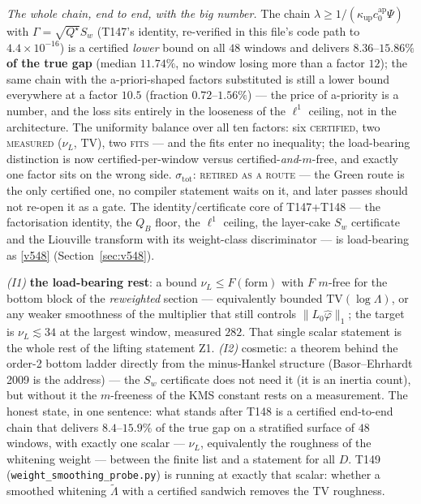 \documentclass[11pt,a4paper]{article}
\begin{document}
\emph{The whole chain, end to end, with the big number.} The chain
$\lambda\ge1/(\kappa_{\mathrm{up}}c_0^{\mathrm{ap}}\Psi)$ with $\Gamma=\sqrt{Q^\star}S_w$
(T147's identity, re-verified in this file's code path to $4.4\times10^{-16}$) is a certified
\emph{lower} bound on all $48$ windows and delivers $\mathbf{8.36}$--$\mathbf{15.86\%}$
\textbf{of the true gap} (median $11.74\%$, no window losing more than a factor $12$); the same
chain with the a-priori-shaped factors substituted is still a lower bound everywhere at a
factor $10.5$ (fraction $0.72$--$1.56\%$) --- the price of a-priority is a number, and the loss
sits entirely in the looseness of the $\ell^1$ ceiling, not in the architecture. The uniformity
balance over all ten factors: six \textsc{certified}, two \textsc{measured} ($\nu_L$,
$\mathrm{TV}$), two \textsc{fits} --- and the fits enter no inequality; the load-bearing
distinction is now certified-per-window versus certified-\emph{and}-$m$-free, and exactly one
factor sits on the wrong side. $\sigma_{\mathrm{tot}}$: \textsc{retired as a route} --- the
Green route is the only certified one, no compiler statement waits on it, and later passes
should not re-open it as a gate. The identity/certificate core of T147+T148 --- the
factorisation identity, the $Q_B$ floor, the $\ell^1$ ceiling, the layer-cake $S_w$ certificate
and the Liouville transform with its weight-class discriminator --- is load-bearing as
\vref{v548}  (Section~\ref{sec:v548}).

\begin{keybox}
\emph{(I1)} \textbf{the load-bearing rest}: a bound $\nu_L\le F(\text{form})$ with $F$
$m$-free for the bottom block of the \emph{reweighted} section --- equivalently bounded
$\mathrm{TV}(\log\Lambda)$, or any weaker smoothness of the multiplier that still controls
$\|L_0\hat\varphi\|_1$; the target is $\nu_L\lesssim34$ at the largest window, measured $282$.
That single scalar statement is the whole rest of the lifting statement Z1. \emph{(I2)}
cosmetic: a theorem behind the order-2 bottom ladder directly from the minus-Hankel structure
(Basor--Ehrhardt 2009 is the address) --- the $S_w$ certificate does not need it (it is an
inertia count), but without it the $m$-freeness of the KMS constant rests on a measurement.
The honest state, in one sentence: what stands after T148 is a certified end-to-end chain that
delivers $8.4$--$15.9\%$ of the true gap on a stratified surface of $48$ windows, with exactly
one scalar --- $\nu_L$, equivalently the roughness of the whitening weight --- between the
finite list and a statement for all $D$.
T149 (\texttt{weight\_smoothing\_probe.py}) is running at exactly that scalar: whether a
smoothed whitening $\tilde\Lambda$ with a certified sandwich removes the TV roughness.
\end{keybox}
\end{document}
